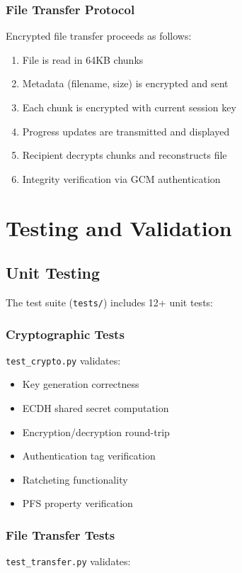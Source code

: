 \documentclass[conference]{IEEEtran}
\begin{document}
\subsubsection{File Transfer Protocol}
Encrypted file transfer proceeds as follows:

\begin{enumerate}
    \item File is read in 64KB chunks
    \item Metadata (filename, size) is encrypted and sent
    \item Each chunk is encrypted with current session key
    \item Progress updates are transmitted and displayed
    \item Recipient decrypts chunks and reconstructs file
    \item Integrity verification via GCM authentication
\end{enumerate}

\section{Testing and Validation}

\subsection{Unit Testing}

The test suite (\texttt{tests/}) includes 12+ unit tests:

\subsubsection{Cryptographic Tests}
\texttt{test\_crypto.py} validates:

\begin{itemize}
    \item Key generation correctness
    \item ECDH shared secret computation
    \item Encryption/decryption round-trip
    \item Authentication tag verification
    \item Ratcheting functionality
    \item PFS property verification
\end{itemize}

\subsubsection{File Transfer Tests}
\texttt{test\_transfer.py} validates:
\end{document}
